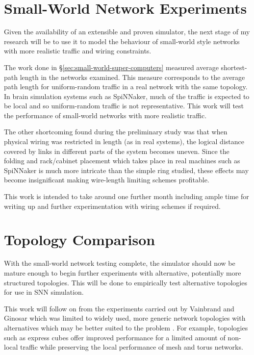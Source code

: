 	
	\section{Small-World Network Experiments}
		
		Given the availability of an extensible and proven simulator, the next stage
		of my research will be to use it to model the behaviour of small-world style
		networks with more realistic traffic and wiring constraints.
		
		The work done in \S\ref{sec:small-world-super-computers} measured average
		shortest-path length in the networks examined. This measure corresponds to
		the average path length for uniform-random traffic in a real network with
		the same topology. In brain simulation systems such as SpiNNaker, much of
		the traffic is expected to be local and so uniform-random traffic is not
		representative.  This work will test the performance of small-world networks
		with more realistic traffic.
		
		The other shortcoming found during the preliminary study was that when
		physical wiring was restricted in length (as in real systems), the logical
		distance covered by links in different parts of the system becomes uneven.
		Since the folding and rack/cabinet placement which takes place in real
		machines such as SpiNNaker is much more intricate than the simple ring
		studied, these effects may become insignificant making wire-length limiting
		schemes profitable.
		
		This work is intended to take around one further month including ample time
		for writing up and further experimentation with wiring schemes if required.
	
	
	\section{Topology Comparison}
		
		
		With the small-world network testing complete, the simulator should now be
		mature enough to begin further experiments with alternative, potentially
		more structured topologies. This will be done to empirically test
		alternative topologies for use in SNN simulation.
		
		This work will follow on from the experiments carried out by Vainbrand and
		Ginosar which was limited to widely used, more generic network topologies
		with alternatives which may be better suited to the problem
		\cite{vainbrand11}. For example, topologies such as express cubes
		\cite{dally91} offer improved performance for a limited amount of non-local
		traffic while preserving the local performance of mesh and torus networks.
	
